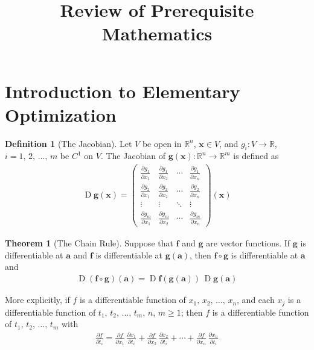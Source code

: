 \documentclass[10pt]{beamer}
\title{Review of Prerequisite Mathematics}
\author{}
\date{}
\DeclareMathOperator*{\jac}{D}
\theoremstyle{definition}
\newtheorem*{dfn}{Definition}
\newtheorem*{thm}{Theorem}
\newcommand{\va}{\mathbf{a}}
\newcommand{\vx}{\mathbf{x}}
\newcommand{\vf}{\mathbf{f}}
\newcommand{\vg}{\mathbf{g}}
\newcommand{\pdiff}[2]{\frac{\partial #1}{\partial #2}}
\begin{document}
\begin{frame}
\titlepage
\end{frame}

\section{Introduction to Elementary Optimization}
\begin{frame}
  \begin{dfn}[The Jacobian]
    Let $V$ be open in $\mathbb{R}^n$, $\vx\in V$, and $g_i:V\to\mathbb{R}$, $i = 1,\,2,\,\ldots,\,m$ be $C^1$ on $V$. The Jacobian of $\vg(\vx): \mathbb{R}^n\to\mathbb{R}^m$ is defined as
    \vspace{-3mm}
    \begin{align*}
      \jac\vg(\vx) = %
      \begin{pmatrix}
        \frac{\partial g_1}{\partial x_1} & \frac{\partial g_1}{\partial x_2} & \cdots & \frac{\partial g_1}{\partial x_{\!n}} \\
        \frac{\partial g_2}{\partial x_1} & \frac{\partial g_2}{\partial x_2} & \cdots & \frac{\partial g_2}{\partial x_{\!n}} \\
        \vdots & \vdots & \ddots &\vdots \\
        \frac{\partial g_m}{\partial x_1} & \frac{\partial g_m}{\partial x_2} & \cdots & \frac{\partial g_m}{\partial x_{\!n}}
      \end{pmatrix}(\vx)
    \end{align*}
  \end{dfn}
  \begin{thm}[The Chain Rule]%
    Suppose that $\vf$ and $\vg$ are vector functions. If $\vg$ is differentiable at $\va$ and $\vf$ is differentiable at $\vg(\va)$, then $\vf\circ\vg$ is differentiable at $\va$ and
    \vspace{-2mm}
    \begin{align*}
      \jac(\vf\circ\vg)(\va) = \jac\vf(\vg(\va))\,\jac\vg(\va)
    \end{align*}

    \vspace{-2mm}
    More explicitly, if $f$ is a differentiable function of $x_1,\,x_2,\,\ldots,\,x_n$, and each $x_j$ is a differentiable function of $t_1,\,t_2,\,\ldots,\,t_m$, $n$, $m\geqslant 1$; then $f$ is a differentiable function of $t_1,\,t_2,\,\ldots,\,t_m$ with
    \vspace{-2mm}
    \begin{align*}
      \pdiff{f}{t_i} = \pdiff{f}{x_1}\,\pdiff{x_1}{t_i} + \pdiff{f}{x_2}\,\pdiff{x_2}{t_i} + \cdots + \pdiff{f}{x_n}\,\pdiff{x_n}{t_i}
    \end{align*}
  \end{thm}
\end{frame}
\end{document}

